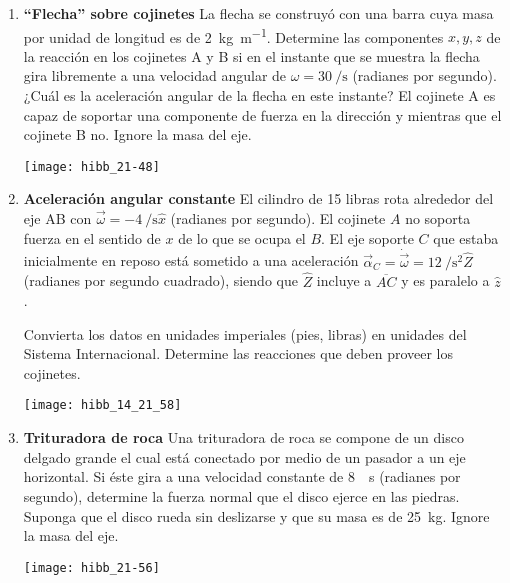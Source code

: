 \documentclass[11pt, spanish, a4paper, twoside]{article}
\begin{document}
\begin{enumerate}
	\item 
	\begin{minipage}[t][4.5cm]{0.55\textwidth}
		\textbf{``Flecha'' sobre cojinetes}
		La flecha se construyó con una barra cuya masa por unidad de longitud es de \SI{2}{\kilo\gram\per\metre}.
		Determine las componentes \(x, y, z\) de la reacción en los cojinetes A y B si en el instante que se muestra la flecha gira libremente a una velocidad angular de \(\omega = \SI{30}{\per\second}\) (radianes por segundo).
		¿Cuál es la aceleración angular de la flecha en este instante?
		El cojinete A es capaz de soportar una componente de fuerza en la dirección y mientras que el cojinete B no.
		Ignore la masa del eje.
	\end{minipage}
	\begin{minipage}[c][0cm][t]{0.4\textwidth}
		\texttt{[image: hibb\_21-48]}
	\end{minipage}


	\item 
	\begin{minipage}[t][6.5cm]{0.65\textwidth}
		\textbf{Aceleración angular constante}
		El cilindro de 15 libras rota alrededor del eje AB con \(\vec{\omega} = -\SI{4}{\per\second} \hat{x}\) (radianes por segundo).
	El cojinete \(A\) no soporta fuerza en el sentido de \(x\) de lo que se ocupa el \(B\).
	El eje soporte \(C\) que estaba inicialmente en reposo está sometido a una aceleración \(\vec{\alpha}_C = \dot{\vec{\omega}} = \SI{12}{\per\second\squared} \hat{Z}\) (radianes por segundo cuadrado), siendo que \(\hat{Z}\) incluye a \(\overline{AC}\) y es paralelo a \(\hat{z}\).
	\begin{tasks}
		\task Convierta los datos en unidades imperiales (pies, libras) en unidades del Sistema Internacional.
		\task Determine las reacciones que deben proveer los cojinetes.
	\end{tasks}
	\end{minipage}
	\begin{minipage}[c][2cm][t]{0.3\textwidth}
		\texttt{[image: hibb\_14\_21\_58]}
	\end{minipage}


	\item 
	\begin{minipage}[t][3.5cm]{0.65\textwidth}
		\textbf{Trituradora de roca}
		Una trituradora de roca se compone de un disco delgado grande el cual está conectado por medio de un pasador a un eje horizontal.
		Si éste gira a una velocidad constante de \SI{8}{\per\second} (radianes por segundo), determine la fuerza normal que el disco ejerce en las piedras.
		Suponga que el disco rueda sin deslizarse y que su masa es de \SI{25}{\kilo\gram}.
		Ignore la masa del eje.
	\end{minipage}
	\begin{minipage}[c][2cm][t]{0.3\textwidth}
		\texttt{[image: hibb\_21-56]}
	\end{minipage}



\end{enumerate}
\end{document}
